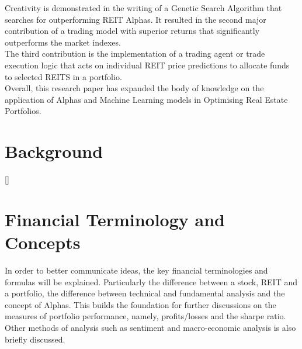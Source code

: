 \documentclass[a4paper,12pt]{report}
\renewcommand\thechapter{\Roman{chapter}}
\numberwithin{equation}{section}
\theoremstyle{definition}
\begin{document}
Creativity is demonstrated in the writing of a Genetic Search Algorithm that searches for outperforming REIT Alphas. It resulted in the second major contribution of a trading model with superior returns that significantly outperforms the market indexes.\\ 

The third contribution is the implementation of a trading agent or trade execution logic that acts on individual REIT price predictions to allocate funds to selected REITS in a portfolio.\\

Overall, this research paper has expanded the body of knowledge on the application of Alphas and Machine Learning models in Optimising Real Estate Portfolios.


\titleformat{\chapter}[block]
  {\normalfont\huge\bfseries}{\thechapter.}{1em}{\Huge\centering}
\titlespacing*{\chapter}{0pt}{150pt}{0pt}
\setcounter{chapter}{0}
\renewcommand{\thechapter}{\Roman{chapter}}
\chapter{Background}



\titleformat{\chapter}[display]{\Large}{\centering
  \MakeUppercase{\chaptername}\quad{\Huge\thechapter}}{10pt}{\titlerule[.5pt]\vspace{10pt}\centering
  \MakeUppercase}[\vspace{10pt}{\titlerule[.5pt]}]%
\titlespacing{\chapter}{0pt}{-80pt}{1cm}%
\renewcommand{\thechapter}{\arabic{chapter}}

\chapter{Financial Terminology and Concepts}
In order to better communicate ideas, the key financial terminologies and formulas will be explained. Particularly the difference between a stock, REIT and a portfolio, the difference between technical and fundamental analysis and the concept of Alphas. This builds the foundation for further discussions on the measures of portfolio performance, namely, profits/losses and the sharpe ratio. Other methods of analysis such as sentiment and macro-economic analysis is also briefly discussed. 
\end{document}
